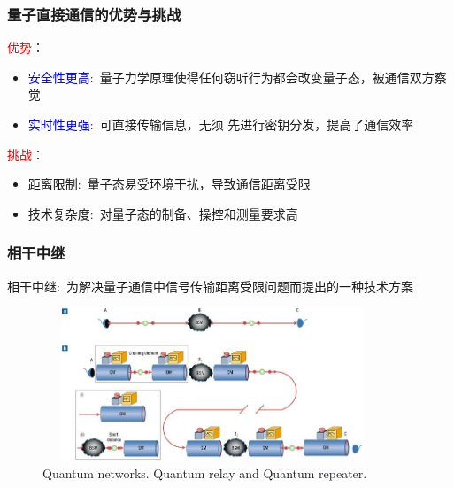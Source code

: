 \begin{frame}
    \frametitle{量子直接通信的优势与挑战}
    \textcolor{red}{优势}：
    \begin{itemize}
	    \item \textcolor{blue}{安全性更高}:~量子力学原理使得任何窃听行为都会改变量子态，被通信双方察觉
	    \item \textcolor{blue}{实时性更强}:~可直接传输信息，无须%
		先进行密钥分发，提高了通信效率
    \end{itemize}

    \textcolor{red}{挑战}：
    \begin{itemize}
        \item 距离限制:~量子态易受环境干扰，导致通信距离受限\\
		{\fontsize{7.5pt}{5.2pt}\selectfont{目前难以实现长距离的直接量子通信}}
        \item 技术复杂度:~对量子态的制备、操控和测量要求高\\
		{\fontsize{7.5pt}{5.2pt}\selectfont{技术实现难度大}}
    \end{itemize}
\end{frame}

\begin{frame}
    \frametitle{相干中继}
        相干中继:~为解决量子通信中信号传输距离受限问题而提出的一种技术方案\\
	{\fontsize{7.5pt}{5.2pt}\selectfont{在量子信号传输过程中，能有效延长量子态的传输距离，同时保持量子态的相干性}}
    \begin{figure}
        \centering
                \includegraphics[height=1.8in, width=4.0in, viewport=0 0 725 366,clip]{Figures/Quantum-networksa-Quantum_relay-Entanglement-resources-Quantum_repeater.jpeg}
		\caption{\tiny{\textrm{Quantum networks. Quantum relay and Quantum repeater.}}}%
		\label{Fig:Quantum-networksa-Quantum_relay-Entanglement-resources-Quantum_repeater}
    \end{figure}
\end{frame}

